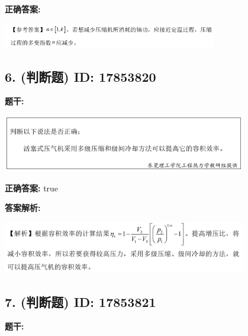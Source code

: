 \documentclass[12pt]{article}
\begin{document}
\textbf{正确答案:}

\begin{center}\includegraphics[width=0.7\textwidth, height=0.2\textheight, keepaspectratio]{question_5_17853826/correct_answer_1_img_1.png}\end{center}

\vspace{0.5em}\hrulefill\vspace{1em}

\subsection*{6. (判断题) \small ID: 17853820}

\textbf{题干:}


\begin{center}\includegraphics[width=0.8\textwidth, height=0.25\textheight, keepaspectratio]{question_6_17853820/title_img_1.png}\end{center}

\textbf{正确答案:}
true

\textbf{答案解析:}


\begin{center}\includegraphics[width=0.8\textwidth, height=0.25\textheight, keepaspectratio]{question_6_17853820/correct_replay_img_1.png}\end{center}

\vspace{0.5em}\hrulefill\vspace{1em}

\subsection*{7. (判断题) \small ID: 17853821}

\textbf{题干:}
\end{document}
